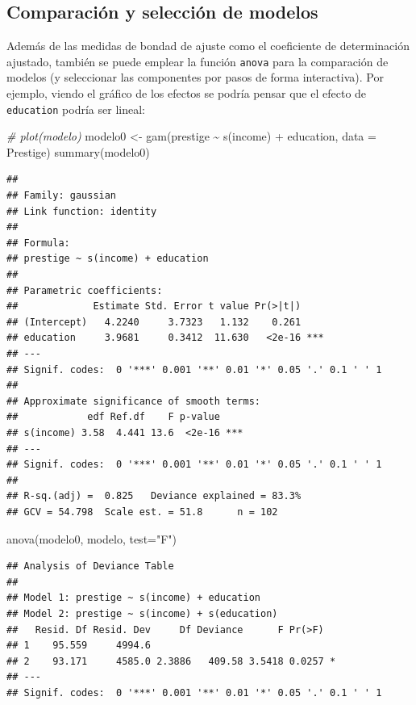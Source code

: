 \documentclass[
  spanish,
]{book}
\newenvironment{Shaded}{\begin{snugshade}}{\end{snugshade}}
\newcommand{\AttributeTok}[1]{\textcolor[rgb]{0.77,0.63,0.00}{#1}}
\newcommand{\CommentTok}[1]{\textcolor[rgb]{0.56,0.35,0.01}{\textit{#1}}}
\newcommand{\FunctionTok}[1]{\textcolor[rgb]{0.00,0.00,0.00}{#1}}
\newcommand{\NormalTok}[1]{#1}
\newcommand{\OtherTok}[1]{\textcolor[rgb]{0.56,0.35,0.01}{#1}}
\newcommand{\SpecialCharTok}[1]{\textcolor[rgb]{0.00,0.00,0.00}{#1}}
\newcommand{\StringTok}[1]{\textcolor[rgb]{0.31,0.60,0.02}{#1}}
\theoremstyle{break}
\theoremstyle{definition}
\theoremstyle{definition}
\theoremstyle{definition}
\theoremstyle{definition}
\theoremstyle{remark}
\begin{document}
\hypertarget{comparaciuxf3n-y-selecciuxf3n-de-modelos}{%
\subsection{Comparación y selección de modelos}\label{comparaciuxf3n-y-selecciuxf3n-de-modelos}}

Además de las medidas de bondad de ajuste como el coeficiente de determinación ajustado, también se puede emplear la función \texttt{anova} para la comparación de modelos (y seleccionar las componentes por pasos de forma interactiva).
Por ejemplo, viendo el gráfico de los efectos se podría pensar que el efecto de \texttt{education} podría ser lineal:

\begin{Shaded}
\begin{Highlighting}[]
\CommentTok{\# plot(modelo)}
\NormalTok{modelo0 }\OtherTok{\textless{}{-}} \FunctionTok{gam}\NormalTok{(prestige }\SpecialCharTok{\textasciitilde{}} \FunctionTok{s}\NormalTok{(income) }\SpecialCharTok{+}\NormalTok{ education, }\AttributeTok{data =}\NormalTok{ Prestige)}
\FunctionTok{summary}\NormalTok{(modelo0)}
\end{Highlighting}
\end{Shaded}

\begin{verbatim}
## 
## Family: gaussian 
## Link function: identity 
## 
## Formula:
## prestige ~ s(income) + education
## 
## Parametric coefficients:
##             Estimate Std. Error t value Pr(>|t|)    
## (Intercept)   4.2240     3.7323   1.132    0.261    
## education     3.9681     0.3412  11.630   <2e-16 ***
## ---
## Signif. codes:  0 '***' 0.001 '**' 0.01 '*' 0.05 '.' 0.1 ' ' 1
## 
## Approximate significance of smooth terms:
##            edf Ref.df    F p-value    
## s(income) 3.58  4.441 13.6  <2e-16 ***
## ---
## Signif. codes:  0 '***' 0.001 '**' 0.01 '*' 0.05 '.' 0.1 ' ' 1
## 
## R-sq.(adj) =  0.825   Deviance explained = 83.3%
## GCV = 54.798  Scale est. = 51.8      n = 102
\end{verbatim}

\begin{Shaded}
\begin{Highlighting}[]
\FunctionTok{anova}\NormalTok{(modelo0, modelo, }\AttributeTok{test=}\StringTok{"F"}\NormalTok{)}
\end{Highlighting}
\end{Shaded}

\begin{verbatim}
## Analysis of Deviance Table
## 
## Model 1: prestige ~ s(income) + education
## Model 2: prestige ~ s(income) + s(education)
##   Resid. Df Resid. Dev     Df Deviance      F Pr(>F)  
## 1    95.559     4994.6                                
## 2    93.171     4585.0 2.3886   409.58 3.5418 0.0257 *
## ---
## Signif. codes:  0 '***' 0.001 '**' 0.01 '*' 0.05 '.' 0.1 ' ' 1
\end{verbatim}
\end{document}
